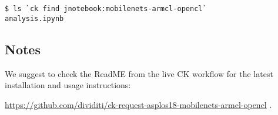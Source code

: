 \begin{verbatim}
$ ls `ck find jnotebook:mobilenets-armcl-opencl`
analysis.ipynb
\end{verbatim}

\subsection{Notes}

We suggest to check the ReadME from the live CK workflow 
for the latest installation and usage instructions: 

\url{https://github.com/dividiti/ck-request-asplos18-mobilenets-armcl-opencl} .
